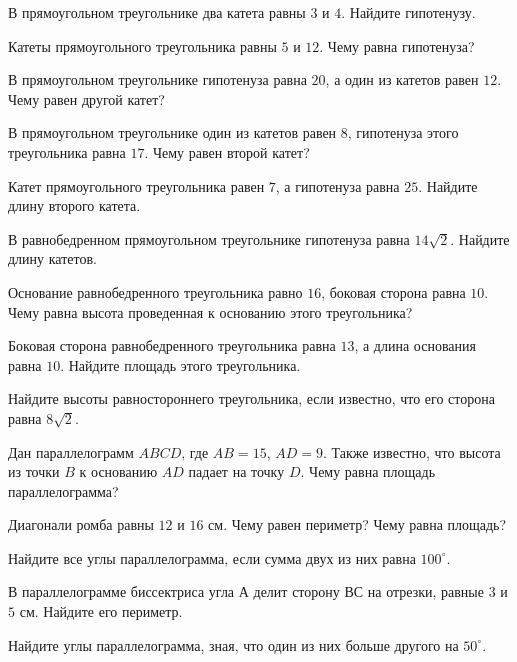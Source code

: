%
%

\begin{class}[number=1]
	\begin{listofex}
		\item В прямоугольном треугольнике два катета равны \( 3 \) и \(  4 \). Найдите гипотенузу.
		\item Катеты прямоугольного треугольника равны \( 5 \) и \( 12 \). Чему равна гипотенуза?
		\item В прямоугольном треугольнике гипотенуза равна \( 20 \), а один из катетов равен \( 12 \). Чему равен другой катет?
		\item В прямоугольном треугольнике один из катетов равен \( 8 \), гипотенуза этого треугольника равна \( 17 \). Чему равен второй катет?
		\item Катет прямоугольного треугольника равен \( 7 \), а гипотенуза равна \( 25 \). Найдите длину второго катета.
		\item В равнобедренном прямоугольном треугольнике гипотенуза равна  \( 14\sqrt{2} \). Найдите длину катетов.
		\item Основание равнобедренного треугольника равно \( 16 \), боковая сторона равна \( 10 \). Чему равна высота проведенная к основанию этого треугольника?
		\item Боковая сторона равнобедренного треугольника равна \( 13 \), а длина основания равна \( 10 \). Найдите площадь этого треугольника.
		\item Найдите высоты равностороннего треугольника, если известно, что его сторона равна \( 8\sqrt{2} \).
		\item Дан параллелограмм \( ABCD \), где \( AB=15 \), \( AD=9 \). Также известно, что высота из точки \( B \) к основанию \( AD \) падает на точку \( D \). Чему равна площадь параллелограмма?
		\item Диагонали ромба равны \( 12 \) и \( 16 \) см. Чему равен периметр? Чему равна площадь? 
		\item Найдите все углы параллелограмма, если сумма двух из них равна \( 100^{\circ}\).
		\item В параллелограмме биссектриса угла \( А \) делит сторону \( ВС  \) на отрезки, равные \( 3 \) и \( 5  \) см. Найдите его периметр.
		\item Найдите углы параллелограмма, зная, что один из них больше другого на \( 50^{\circ} \).
	\end{listofex}
\end{class}

